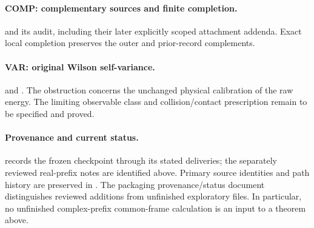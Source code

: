 \paragraph{COMP: complementary sources and finite completion.}
 and its audit, including their later explicitly scoped attachment addenda. Exact local completion preserves the outer and prior-record complements.

\paragraph{VAR: original Wilson self-variance.}
 and
.
The obstruction concerns the unchanged physical calibration of the raw energy. The limiting observable class and collision/contact prescription remain to be specified and proved.

\paragraph{Provenance and current status.}
 records the frozen checkpoint through its stated deliveries; the separately reviewed real-prefix notes are identified above. Primary source identities and path history are preserved in
.
The packaging provenance/status document distinguishes reviewed additions from unfinished exploratory files. In particular, no unfinished complex-prefix common-frame calculation is an input to a theorem above.

